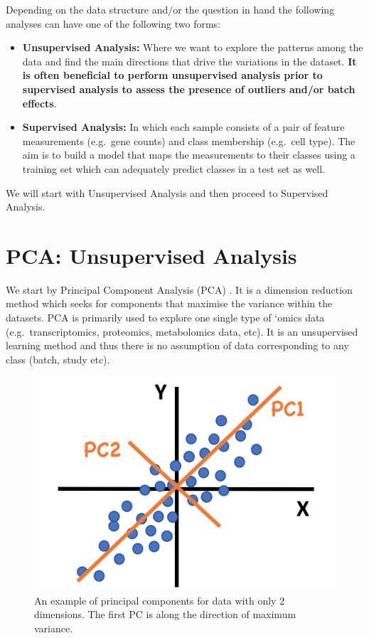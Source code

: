\documentclass[]{book}
\theoremstyle{definition}
\theoremstyle{definition}
\theoremstyle{definition}
\theoremstyle{remark}
\begin{document}
Depending on the data structure and/or the question in hand the
following analyses can have one of the following two forms:

\begin{itemize}
\item
  \textbf{Unsupervised Analysis:} Where we want to explore the patterns
  among the data and find the main directions that drive the variations
  in the dataset. \textbf{It is often beneficial to perform unsupervised
  analysis prior to supervised analysis to assess the presence of
  outliers and/or batch effects}.
\item
  \textbf{Supervised Analysis:} In which each sample consists of a pair
  of feature measurements (e.g.~gene counts) and class membership
  (e.g.~cell type). The aim is to build a model that maps the
  measurements to their classes using a training set which can
  adequately predict classes in a test set as well.
\end{itemize}

We will start with Unsupervised Analysis and then proceed to Supervised
Analysis.

\hypertarget{pca-unsupervised-analysis}{%
\section{PCA: Unsupervised Analysis}\label{pca-unsupervised-analysis}}

We start by Principal Component Analysis (PCA) \citep{pca}. It is a
dimension reduction method which seeks for components that maximise the
variance within the datasets. PCA is primarily used to explore one
single type of `omics data (e.g.~transcriptomics, proteomics,
metabolomics data, etc). It is an unsupervised learning method and thus
there is no assumption of data corresponding to any class (batch, study
etc).

\begin{figure}[ht]

{\centering \includegraphics[width=0.4\linewidth]{figures/pca} 

}

\caption{An example of principal components for data with only 2 dimensions. The first PC is along the direction of maximum variance.}\label{fig:1-pcaExample}
\end{figure}
\end{document}
